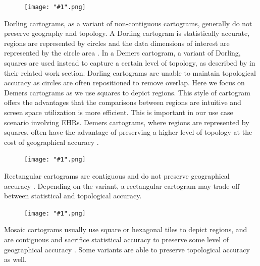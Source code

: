 \documentclass[Afour,sagev,times]{sagej}
\newcommand{\thumbnail}[2]{
    \begin{samepage}

      \setlength{\intextsep}{3pt}
      \setlength{\columnsep}{3pt}
      \begin{figure}
        \vspace{-15pt}
        \begin{center}
          \texttt{[image: "\#1".png]}
        \end{center}
      \end{figure}
      #2
      
    \end{samepage}
}
\begin{document}
\thumbnail{dorling}{
    Dorling cartograms, as a variant of non-contiguous cartograms, generally do not preserve geography and topology.
    A Dorling cartogram is statistically accurate, regions are represented by circles and the data dimensions of interest are represented by the circle area \cite{dorling2011Area}.
    In a Demers cartogram, a variant of Dorling, squares are used instead to capture a certain level of topology, as described by \citet{cano2015Mosaic} in their related work section.
    Dorling cartograms are unable to maintain topological accuracy as circles are often repositioned to remove overlap.
    Here we focus on Demers cartograms as we use squares to depict regions.
    This style of cartogram offers the advantages that the comparisons between regions are intuitive and screen space utilization is more efficient.
    This is important in our use case scenario involving EHRs.
    Demers cartograms, where regions are represented by squares, often have the advantage of preserving a higher level of topology at the cost of geographical accuracy \cite{ian2002Cartogram}.
}

\thumbnail{rectangular}{
    Rectangular cartograms are contiguous and do not preserve geographical accuracy \cite{raisz1934Rectangular, vankreveld2004Rectangular}.
    Depending on the variant, a rectangular cartogram may trade-off between statistical and topological accuracy.
}

\thumbnail{mosaic}{
    Mosaic cartograms usually use square or hexagonal tiles to depict regions, and are contiguous and sacrifice statistical accuracy to preserve some level of geographical accuracy \cite{cano2015Mosaic}.
    Some variants are able to preserve topological accuracy as well.
}
\end{document}
